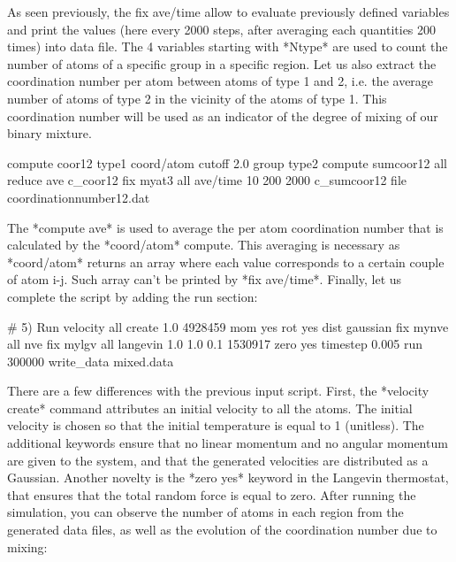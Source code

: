 As seen previously, the fix ave/time
allow to evaluate previously defined variables and print
the values (here every 2000 steps, after averaging each quantities 200 times)
into data file. The 4 variables starting with *Ntype* are used to count
the number of atoms of a specific group in a specific
region. 
Let us also extract the coordination number per atom between atoms 
of type 1 and 2, i.e. the average number of atoms of type 2 in the vicinity 
of the atoms of type 1. This coordination number will be used as an indicator of the 
degree of mixing of our binary mixture. 




\begin{lcverbatim}
compute coor12 type1 coord/atom cutoff 2.0 group type2
compute sumcoor12 all reduce ave c_coor12
fix myat3 all ave/time 10 200 2000 c_sumcoor12 file coordinationnumber12.dat

\end{lcverbatim}

The *compute ave* is used to average the per atom
coordination number that is calculated by the *coord/atom* compute.
This averaging is necessary as *coord/atom* returns an array where each value corresponds 
to a certain couple of atom i-j. Such array can't be printed by *fix ave/time*. 
Finally, let us complete the script by adding the run section:



\begin{lcverbatim}
# 5) Run
velocity all create 1.0 4928459 mom yes rot yes dist gaussian
fix mynve all nve
fix mylgv all langevin 1.0 1.0 0.1 1530917 zero yes
timestep 0.005
run 300000
write_data mixed.data
\end{lcverbatim}

There are a few differences with the
previous input script. First, the *velocity create*
command attributes an initial velocity to all the atoms.
The initial velocity is chosen so that the initial
temperature is equal to 1 (unitless). The additional
keywords ensure that no linear momentum and no angular
momentum are given to the system, and that the generated
velocities are distributed as a Gaussian. Another novelty
is the *zero yes* keyword in the Langevin thermostat, that
ensures that the total random force is equal to zero.
After running the simulation, you can observe the number
of atoms in each region from the generated data files, as
well as the evolution of the coordination number due to
mixing:












